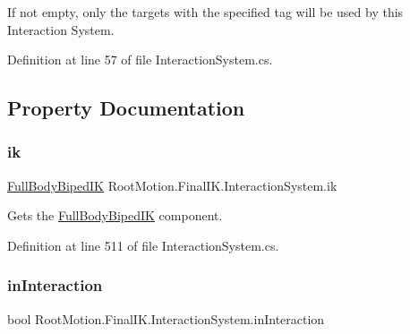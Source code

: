 If not empty, only the targets with the specified tag will be used by this Interaction System. 



Definition at line 57 of file Interaction\+System.\+cs.



\subsection{Property Documentation}
\mbox{\label{class_root_motion_1_1_final_i_k_1_1_interaction_system_ac1fe649bfc257a53bcf52925fb82066d}} 
\subsubsection{\texorpdfstring{ik}{ik}}
{\footnotesize\ttfamily \mbox{\hyperlink{class_root_motion_1_1_final_i_k_1_1_full_body_biped_i_k}{Full\+Body\+Biped\+IK}} Root\+Motion.\+Final\+I\+K.\+Interaction\+System.\+ik\hspace{0.3cm}{\ttfamily [get]}}



Gets the \mbox{\hyperlink{class_root_motion_1_1_final_i_k_1_1_full_body_biped_i_k}{Full\+Body\+Biped\+IK}} component. 



Definition at line 511 of file Interaction\+System.\+cs.

\mbox{\label{class_root_motion_1_1_final_i_k_1_1_interaction_system_a0769374cb412651cc5067066436e80a6}} 
\subsubsection{\texorpdfstring{in\+Interaction}{inInteraction}}
{\footnotesize\ttfamily bool Root\+Motion.\+Final\+I\+K.\+Interaction\+System.\+in\+Interaction\hspace{0.3cm}{\ttfamily [get]}}




